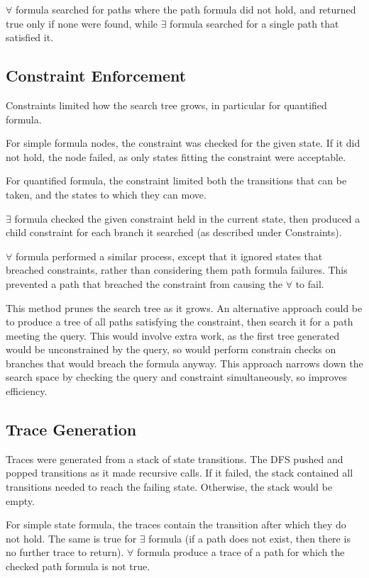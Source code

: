 \documentclass[a4paper,11pt]{article}
\begin{document}
	$\forall$ formula searched for paths where the path formula did not hold, and returned true only if none were found, while $\exists$ formula searched for a single path that satisfied it.
	
	\subsection{Constraint Enforcement}
	Constraints limited how the search tree grows, in particular for quantified formula. 
	
	For simple formula nodes, the constraint was checked for the given state. If it did not hold, the node failed, as only states fitting the constraint were acceptable.
	
	For quantified formula, the constraint limited both the transitions that can be taken, and the states to which they can move. 
	
	$\exists$ formula checked the given constraint held in the current state, then produced a child constraint for each branch it searched (as described under Constraints).
	
	$\forall$ formula performed a similar process, except that it ignored states that breached constraints, rather than considering them path formula failures. This prevented a path that breached the constraint from causing the $\forall$ to fail.
	
	This method prunes the search tree as it grows. An alternative approach could be to produce a tree of all paths satisfying the constraint, then search it for a path meeting the query. This would involve extra work, as the first tree generated would be unconstrained by the query, so would perform constrain checks on branches that would breach the formula anyway. This approach narrows down the search space by checking the query and constraint simultaneously, so improves efficiency.
	
	\subsection{Trace Generation}
	Traces were generated from a stack of state transitions. The DFS pushed and popped transitions as it made recursive calls. If it failed, the stack contained all transitions needed to reach the failing state. Otherwise, the stack would be empty.
	
	For simple state formula, the traces contain the transition after which they do not hold. The same is true for $\exists$ formula (if a path does not exist, then there is no further trace to return). $\forall$ formula produce a trace of a path for which the checked path formula is not true. 
	
\end{document}
